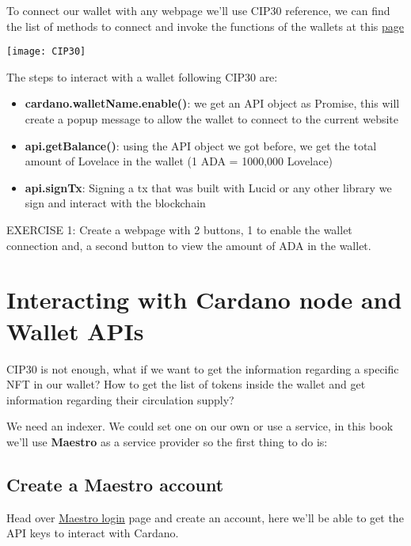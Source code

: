 To connect our wallet with any webpage we'll use \gls{CIP}30 reference, we can find the list of methods to connect and invoke the functions of the wallets at this \href{https://www.cardano-caniuse.io/}{page}

\texttt{[image: CIP30]}

The steps to interact with a wallet following CIP30 are:

\begin{itemize}
  \item \textbf{cardano.{walletName}.enable()}: we get an API object as Promise, this will create a popup message to allow the wallet to connect to the current website
  \item \textbf{api.getBalance()}: using the API object we got before, we get the total amount of Lovelace in the wallet (1 ADA = 1000,000 Lovelace)
  \item \textbf{api.signTx}: Signing a tx that was built with Lucid or any other library we sign and interact with the blockchain
\end{itemize}

\begin{remark}
  EXERCISE 1: Create a webpage with 2 buttons, 1 to enable the wallet connection and, a second button to view the amount of ADA in the wallet.
\end{remark}




\section{Interacting with Cardano node and Wallet APIs}

CIP30 is not enough, what if we want to get the information regarding a specific NFT in our wallet?
How to get the list of tokens inside the wallet and get information regarding their circulation supply?

We need an indexer. We could set one on our own or use a service, in this book we'll use \textbf{Maestro} as a service provider so the first thing to do is:

\subsection{Create a Maestro account}

Head over \href{https://dashboard.gomaestro.org/login}{Maestro login} page and create an account, here we'll be able to get the API keys to interact with Cardano.

